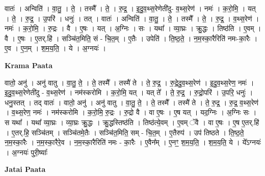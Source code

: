 \documentclass[17pt]{extarticle}
\begin{document}
वातः॑ । अन्विति॑ । वा॒तु॒ । ते॒ । तस्मै᳚ । ते॒ । रु॒द्र॒ । इ॒दु॒व॒थ्स॒रेणेती॑दु- व॒थ्स॒रेण॑ । नमः॑ । क॒रो॒मि॒ । यत् । ते॒ । रु॒द्र॒ । उ॒परि॑ । धनुः॑ । तत् । वातः॑ । अन्विति॑ । वा॒तु॒ । ते॒ । तस्मै᳚ । ते॒ । रु॒द्र॒ । व॒थ्स॒रेण॑ । नमः॑ । क॒रो॒मि॒ । रु॒द्रः । वै । ए॒षः । यत् । अ॒ग्निः । सः । यथा᳚ । व्या॒घ्रः । क्रु॒द्धः । तिष्ठ॑ति । ए॒वम् । वै । ए॒षः । ए॒तर्.हि॑ । सञ्चि॑त॒मिति॒ सं - चि॒त॒म् । ए॒तैः । उपेति॑ । ति॒ष्ठ॒ते॒ । न॒म॒स्का॒रैरिति॑ नमः-का॒रैः । ए॒व । ए॒न॒म् । श॒म॒य॒ति॒ । ये । अ॒ग्नयः॑ ।  \newline


\textbf{Krama Paata} \newline

वातो॒ अनु॑ । अनु॑ वातु । वा॒तु॒ ते॒ । ते॒ तस्मै᳚ । तस्मै॑ ते । ते॒ रु॒द्र॒ । रु॒द्रे॒दु॒व॒थ्स॒रेण॑ । इ॒दु॒व॒थ्स॒रेण॒ नमः॑ । इ॒दु॒व॒थ्स॒रेणेती॑दु - व॒थ्स॒रेण॑ । नम॑स्करोमि । क॒रो॒मि॒ यत् । यत् ते᳚ । ते॒ रु॒द्र॒ । रु॒द्रो॒परि॑ । उ॒परि॒ धनुः॑ । धनु॒स्तत् । तद् वातः॑ । वातो॒ अनु॑ । अनु॑ वातु । वा॒तु॒ ते॒ । ते॒ तस्मै᳚ । तस्मै॑ ते । ते॒ रु॒द्र॒ । रु॒द्र॒ व॒थ्स॒रेण॑ । व॒थ्स॒रेण॒ नमः॑ । नम॑स्करोमि । क॒रो॒मि॒ रु॒द्रः । रु॒द्रो वै । वा ए॒षः । ए॒ष यत् । यद॒ग्निः । अ॒ग्निः सः । स यथा᳚ । यथा᳚ व्या॒घ्रः । व्या॒घ्रः क्रु॒द्धः । क्रु॒द्धस्तिष्ठ॑ति । तिष्ठ॑त्ये॒वम् । ए॒वम् ॅवै । वा ए॒षः । ए॒ष ए॒तर्.हि॑ । ए॒तर्.हि॒ सञ्चि॑तम् । सञ्चि॑तमे॒तैः । सञ्चि॑त॒मिति॒ सम् - चि॒त॒म् । ए॒तैरुप॑ । उप॑ तिष्ठते । ति॒ष्ठ॒ते॒ न॒म॒स्का॒रैः । न॒म॒स्का॒रैरे॒व । न॒म॒स्का॒रैरिति॑ नमः - का॒रैः । ए॒वैन᳚म् । ए॒नꣳ॒॒ श॒म॒य॒ति॒ । श॒म॒य॒ति॒ ये । ये᳚ऽग्नयः॑ । अ॒ग्नयः॑ पुरी॒ष्याः᳚ \newline

\textbf{Jatai Paata} \newline
\end{document}
